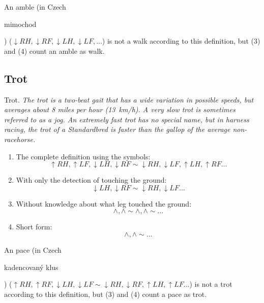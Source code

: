 \begin{remark}
    An amble (in Czech \begin{otherlanguage}{czech}mimochod\end{otherlanguage}) ($\downarrow RH, \downarrow RF, \downarrow LH, \downarrow LF, \dots$) is not a walk according to this definition, but (3) and (4) count an amble as walk.
\end{remark}

\subsection{Trot}
\begin{definition}{Trot.}
    \label{def:trot}
    \textit{The trot is a two-beat gait that has a wide variation in possible speeds, but averages about 8 miles per hour (\SI{13}{km/h}). A very slow trot is sometimes referred to as a jog. An extremely fast trot has no special name, but in harness racing, the trot of a Standardbred is faster than the gallop of the average non-racehorse.} \cite{Harrisc1993}
    
    \begin{enumerate}
        \item The complete definition using the symbols:
        $$ \uparrow RH, \uparrow LF, \downarrow LH, \downarrow RF \sim \downarrow RH, \downarrow LF, \uparrow LH, \uparrow RF \dots $$
        \item With only the detection of touching the ground:
        $$ \downarrow LH, \downarrow RF \sim \downarrow RH, \downarrow LF \dots $$
        \item Without knowledge about what leg touched the ground:
        $$ \wedge, \wedge \sim \wedge, \wedge \sim \dots $$
        \item Short form:
        $$ \wedge, \wedge \sim \dots $$
    \end{enumerate}
\end{definition}

\begin{remark}
    An pace (in Czech \begin{otherlanguage}{czech}kadencovaný klus\end{otherlanguage}) ($\uparrow RH, \uparrow RF, \downarrow LH, \downarrow LF \sim \downarrow RH, \downarrow RF, \uparrow LH, \uparrow LF \dots$) is not a trot according to this definition, but (3) and (4) count a pace as trot.
\end{remark}


